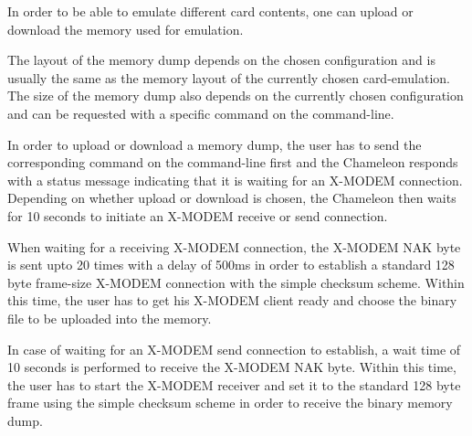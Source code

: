 In order to be able to emulate different card contents, one can upload or download the memory used for emulation.

The layout of the memory dump depends on the chosen configuration and is usually the same as the memory layout of the currently chosen card-\/emulation. The size of the memory dump also depends on the currently chosen configuration and can be requested with a specific command on the command-\/line.

In order to upload or download a memory dump, the user has to send the corresponding command on the command-\/line first and the Chameleon responds with a status message indicating that it is waiting for an X-\/\-M\-O\-D\-E\-M connection. Depending on whether upload or download is chosen, the Chameleon then waits for 10 seconds to initiate an X-\/\-M\-O\-D\-E\-M receive or send connection.

When waiting for a receiving X-\/\-M\-O\-D\-E\-M connection, the X-\/\-M\-O\-D\-E\-M N\-A\-K byte is sent upto 20 times with a delay of 500ms in order to establish a standard 128 byte frame-\/size X-\/\-M\-O\-D\-E\-M connection with the simple checksum scheme. Within this time, the user has to get his X-\/\-M\-O\-D\-E\-M client ready and choose the binary file to be uploaded into the memory.

In case of waiting for an X-\/\-M\-O\-D\-E\-M send connection to establish, a wait time of 10 seconds is performed to receive the X-\/\-M\-O\-D\-E\-M N\-A\-K byte. Within this time, the user has to start the X-\/\-M\-O\-D\-E\-M receiver and set it to the standard 128 byte frame using the simple checksum scheme in order to receive the binary memory dump. 